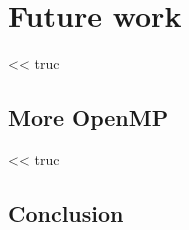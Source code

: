 

















\part{Future work}

\begin{savequote}[6cm]
<< truc
\end{savequote}

\chapter{More OpenMP}\label{chap:contrib:TODO}
\chaptertoc

%

\begin{savequote}[6cm]
<< truc
\end{savequote}

\chapter{Conclusion}\label{chap:contrib:TODO}
\chaptertoc

%
%

